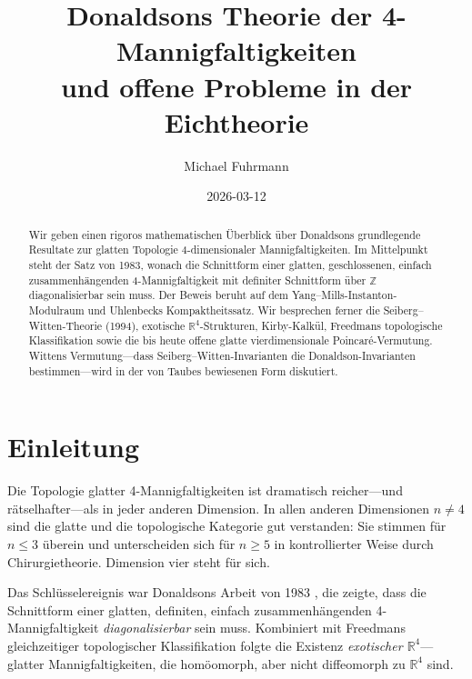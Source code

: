 \documentclass[12pt,a4paper]{amsart}
\theoremstyle{definition}
\theoremstyle{remark}
\newcommand{\ZZ}{\mathbb{Z}}
\newcommand{\RR}{\mathbb{R}}
\begin{document}
\begin{abstract}
Wir geben einen rigoros mathematischen Überblick über Donaldsons
grundlegende Resultate zur glatten Topologie 4-dimensionaler Mannigfaltig\-keiten.
Im Mittelpunkt steht der Satz von 1983, wonach die Schnittform einer
glatten, geschlossenen, einfach zusammenhängenden 4-Mannigfaltigkeit mit
definiter Schnittform über $\ZZ$ diagonalisierbar sein muss.
Der Beweis beruht auf dem Yang--Mills-Instanton-Modulraum und
Uhlenbecks Kompaktheits\-satz.
Wir besprechen ferner die Seiberg--Witten-Theorie (1994), exotische
$\RR^4$-Strukturen, Kirby-Kalkül, Freedmans topologische Klassifikation
sowie die bis heute offene glatte vierdimensionale Poincaré-Vermutung.
Wittens Vermutung---dass Seiberg--Witten-Invarianten die
Donaldson-Invarianten bestimmen---wird in der von Taubes bewiesenen
Form diskutiert.
\end{abstract}

\title{Donaldsons Theorie der 4-Mannigfaltigkeiten\\
\large und offene Probleme in der Eichtheorie}

\author{Michael Fuhrmann}
\address{Specialist Mathematics Project, Build 169}
\date{2026-03-12}

\maketitle
\tableofcontents

\section{Einleitung}

Die Topologie glatter 4-Mannigfaltigkeiten ist dramatisch reicher---und
rätselhafter---als in jeder anderen Dimension.  In allen anderen Dimensionen
$n \neq 4$ sind die glatte und die topologische Kategorie gut verstanden:
Sie stimmen für $n \le 3$ überein und unterscheiden sich für $n \ge 5$ in
kontrollierter Weise durch Chirurgietheorie.  Dimension vier steht für sich.

Das Schlüsselereignis war Donaldsons Arbeit von 1983 \cite{Donaldson1983},
die zeigte, dass die Schnittform einer glatten, definiten, einfach
zusammenhängenden 4-Mannigfaltigkeit \emph{diagonalisierbar} sein muss.
Kombiniert mit Freedmans gleichzeitiger topologischer Klassifikation
\cite{Freedman1982} folgte die Existenz \emph{exotischer $\RR^4$}---glatter
Mannigfaltigkeiten, die homöomorph, aber nicht diffeomorph zu $\RR^4$ sind.
\end{document}
